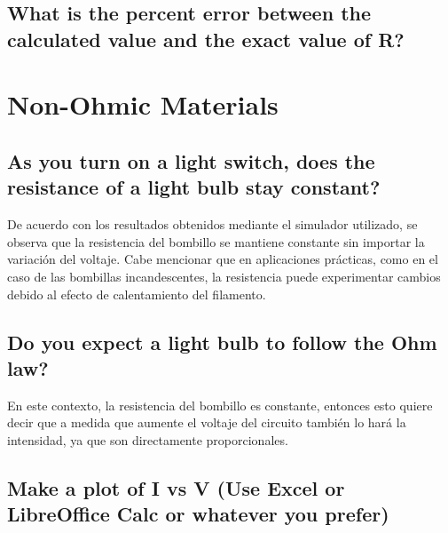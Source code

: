 \documentclass[twocolumn, 12pt]{article}
\begin{document}
\subsection{What is the percent error between the calculated value and the exact value of R?}

\section{Non-Ohmic Materials}

\subsection{As you turn on a light switch, does the resistance of a light bulb stay constant?}

De acuerdo con los resultados obtenidos mediante el
simulador utilizado, se observa que la resistencia del
bombillo se mantiene constante sin importar la variación
del voltaje. Cabe mencionar que en aplicaciones prácticas,
como en el caso de las bombillas incandescentes, la
resistencia puede experimentar cambios debido al efecto de
calentamiento del filamento.

\subsection{Do you expect a light bulb to follow the Ohm law?}

\nocite{prezi.com}

En este contexto, la resistencia del bombillo es constante,
entonces esto quiere decir que a medida que aumente el
voltaje del circuito también lo hará la intensidad, ya que
son directamente proporcionales.

\subsection*{Make a plot of I vs V (Use Excel or LibreOffice Calc or whatever you prefer)}
\end{document}
